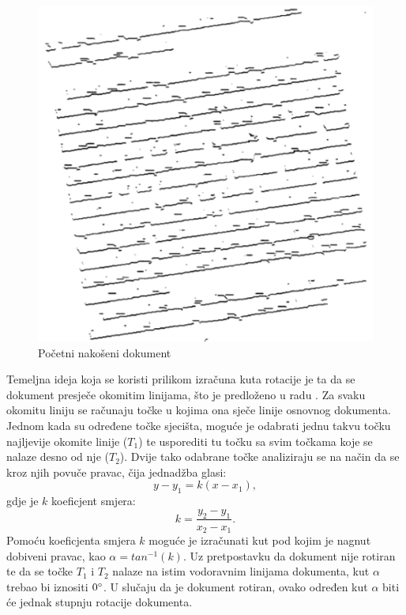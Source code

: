 \documentclass[times, utf8, zavrsni, numeric]{fer}
\begin{document}
\begin{figure}[ht!] 
    \centering
    \includegraphics[width=.4\textwidth]{Images/Skew_original.png}
    \captionsetup{justification=centering}
    \caption{Početni nakošeni dokument\cite{article:Skew-detection}}
    \label{fig:skew_original}
\end{figure}

Temeljna ideja koja se koristi prilikom izračuna kuta rotacije je ta da se dokument presječe okomitim linijama, što je predloženo u radu \cite{article:Skew-detection}.
Za svaku okomitu liniju se računaju točke u kojima ona sječe linije osnovnog dokumenta.
Jednom kada su određene točke sjecišta, moguće je odabrati jednu takvu točku najljevije okomite linije ($T_1$) te usporediti tu točku sa svim točkama koje se nalaze desno od nje ($T_2$).
Dvije tako odabrane točke analiziraju se na način da se kroz njih povuče pravac, čija jednadžba glasi: 
\[
    y - y_1 = k(x - x_1),
\]
gdje je $k$ koeficjent smjera:
\[
    k = \frac{y_2 - y_1}{x_2 - x_1}.
\]
Pomoću koeficjenta smjera $k$ moguće je izračunati kut pod kojim je nagnut dobiveni pravac, kao $\alpha = tan^{-1}(k)$.
Uz pretpostavku da dokument nije rotiran te da se točke $T_1$ i $T_2$ nalaze na istim vodoravnim linijama dokumenta, kut $\alpha$ trebao bi iznositi $0\degree$.
U slučaju da je dokument rotiran, ovako određen kut $\alpha$ biti će jednak stupnju rotacije dokumenta.\\
\end{document}
